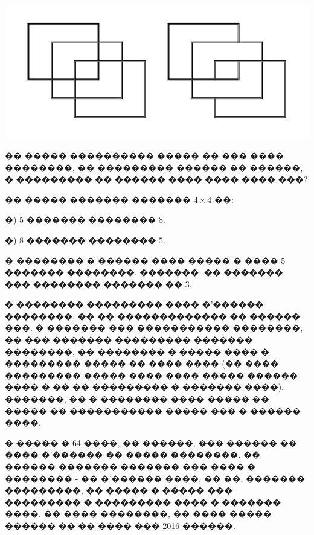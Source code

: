 \documentclass[a4paper,12pt]{article}
\begin{document}
\begin{enumerate}
\begin{minipage}{.55\textwidth}
\begin{center}
\includegraphics[scale=0.4]{paint}
\end{center}
\end{minipage}
\begin{minipage}{.35\textwidth}

      \item �� ����� ���������� ����� �� ��� ���� ��������, �� ��������� ������ �� ������, � ��������� �� ������ ���� ���� ���� ���?
\end{minipage}







\item �� ����� ������� ������� $4\times 4$ ��:

�) 5 ������� �������� $8$.

�) 8 ������� �������� $5$.


\item � �������� � ������ ���� ����� � ���� $5$ ������� ��������. �������, �� ������� ��� �������� ������� �� $3$.

\item � �������� ��������� ���� �'������ ��������, �� �� ������������� �� ������ ���. � ������� ��� ����������� ��������, �� ��� ������� ��������� ������� ��������, �� �������� � ����� ���� � ��������� ����� �� ���� ���� (�� ���� ��������� ����� ���� ���� ����� ������ ���� � �� �� ��������� � ������� ����). �������, �� � �������� ���� ����� �� ����� �� ����������� ����� ��� � ������ ����.

\item � ����� � 64 ����, �� ������, ��� ������ �� ���� �'������ �� ����� ��������. �� ������ ������� ������� ��� ���� � �������� - �� �'������ ����, �� ��. ������� ���������, �� ����� � ����� ��� ��������� � ��������� ���� � ������� ����. �� ���� ��������, �� ���� ����� ������ �� �� ���� ��� 2016 ������.




\end{enumerate}
\end{document}
